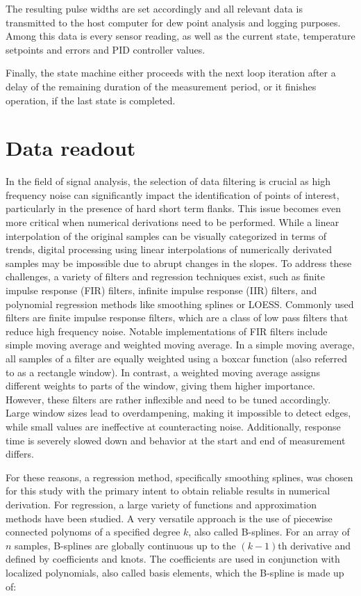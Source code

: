 The resulting pulse widths are set accordingly and all relevant data is transmitted to the host computer for dew point analysis and logging purposes. Among this data is every sensor reading, as well as the current state, temperature setpoints and errors and \gls{PID} controller values.

Finally, the state machine either proceeds with the next loop iteration after a delay of the remaining duration of the measurement period, or it finishes operation, if the last state is completed.


\section{Data readout}\label{c:readout}

In the field of signal analysis, the selection of data filtering is crucial as high frequency noise can significantly impact the identification of points of interest, particularly in the presence of hard short term flanks. This issue becomes even more critical when numerical derivations need to be performed. While a linear interpolation of the original samples can be visually categorized in terms of trends, digital processing using linear interpolations of numerically derivated samples may be impossible due to abrupt changes in the slopes. To address these challenges, a variety of filters and regression techniques exist, such as finite impulse response (FIR) filters, infinite impulse response (IIR) filters, and polynomial regression methods like smoothing splines or LOESS. Commonly used filters are finite impulse response filters, which are a class of low pass filters that reduce high frequency noise. Notable implementations of FIR filters include simple moving average and weighted moving average. In a simple moving average, all samples of a filter are equally weighted using a boxcar function (also referred to as a rectangle window). In contrast, a weighted moving average assigns different weights to parts of the window, giving them higher importance. However, these filters are rather inflexible and need to be tuned accordingly. Large window sizes lead to overdampening, making it impossible to detect edges, while small values are ineffective at counteracting noise. Additionally, response time is severely slowed down and behavior at the start and end of measurement differs. 

For these reasons, a regression method, specifically smoothing splines, was chosen for this study with the primary intent to obtain reliable results in numerical derivation. For regression, a large variety of functions and approximation methods have been studied. A very versatile approach is the use of piecewise connected polynoms of a specified degree $k$, also called B-splines. For an array of $n$ samples, B-splines are globally continuous up to the $(k-1)$th derivative and defined by coefficients and knots. The coefficients are used in conjunction with localized polynomials, also called basis elements, which the B-spline is made up of:

